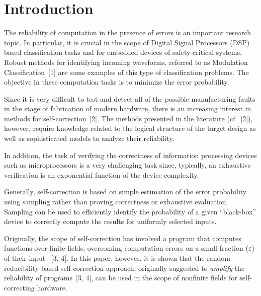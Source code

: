 






      \thispagestyle{myheadings}

      \begin{multicols}{2}

            \label{st\stat}


\section{Introduction}

\noindent
The reliability of computation in the presence of errors is an important research topic. 
In particular, it is crucial in the 
scope of Digital Signal Processors (DSP) based classification tasks
and for embedded devices of safety-critical systems. 
Robust methods for identifying incoming waveforms, referred to as Modulation 
Classification~[1] are  some 
examples of this type of classification problems. The objective in these computation tasks is to minimize the error 
probability.

Since it is very difficult to test and detect all of the possible manufacturing faults in the stage of fabrication of modern 
hardware, there is an increasing interest in methods for self-correction~[2]. The 
methods presented in the literature (cf.~[2]), 
however, require knowledge related to the logical structure of the target design 
as well as sophisticated models to 
analyze their reliability.

In addition, the task of verifying the correctness of information processing devices 
such as microprocessors is a very 
challenging task since, typically, an exhaustive verification is an exponential function 
of the device complexity. 

   Generally, self-correction is based on simple estimation of the error probability using sampling rather than proving 
correctness or exhaustive evaluation.  Sampling can be used to efficiently identify the probability of a given ``black-box'' 
device to correctly compute the results for uniformly selected inputs. 
   
   Originally, the scope of self-correction has involved a program that computes functions-over-finite-fields, overcoming 
computation errors on a small fraction ($\varepsilon$) of their input~ [3, 4]. 
In this paper, however, it is shown that the 
random reducibility-based self-correction approach, originally suggested to \textit{amplify} the reliability of 
programs~[3, 4], can be used in the scope of nonfinite fields for self-correcting hardware. 
   

\end{multicols}
